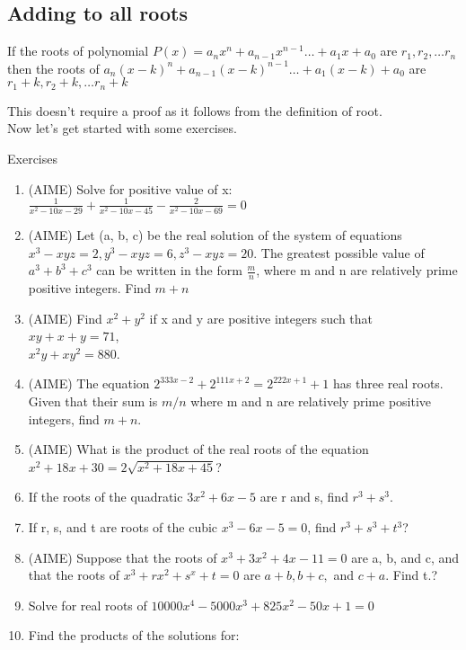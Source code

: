 \subsection{Adding to all roots}
\begin{theorem}
    If the roots of polynomial $P(x)=a_nx^n+a_{n-1}x^{n-1}\dots+a_1x+a_0$ are $r_1,r_2,\dots r_n$ then the roots of $a_n(x-k)^n+a_{n-1}(x-k)^{n-1}\dots+a_{1}(x-k)+a_0$ are $r_1+k, r_2+k, \dots r_n+k$
\end{theorem}
This doesn't require a proof as it follows from the definition of root.\\
Now let's get started with some exercises.
\begin{xcb}{Exercises}
\begin{enumerate}
\item (AIME) Solve for positive value of x:\\
$\frac{1}{x^2-10x-29}+\frac{1}{x^2-10x-45}-\frac{2}{x^2-10x-69}=0$
\item (AIME) Let (a, b, c) be the real solution of the system of equations $x^3 - xyz = 2, y^3 - xyz = 6,
z^3 - xyz = 20$. The greatest possible value of $a^3 + b^3 + c^3$ can be written in the form $\frac{m}{n}$,
where m and n are relatively prime positive integers. Find $m + n$
\item (AIME) Find $x^2 + y^2$ if x and y are positive integers such that\\
$xy + x + y = 71$,\\
$x^2y + xy^2 = 880$.
\item (AIME) The equation $2^{333x-2} + 2^{111x+2} = 2^{222x+1} + 1$ has three real roots. Given that their
sum is $m/n$ where m and n are relatively prime positive integers, find $m + n$.
\item (AIME) What is the product of the real roots of the equation $x^2 + 18x + 30 = 2 \sqrt{x^2 + 18x + 45}$?
\item If the roots of the quadratic $3x^2 + 6x - 5$ are r and s, find $r^3 + s^3$.
\item If r, s, and t are roots of the cubic $x^3 - 6x - 5 = 0$, find $r^3 + s^3 + t^3$?
\item (AIME) Suppose that the roots of $x^3 + 3x^2 + 4x - 11 = 0$ are a, b, and c, and that the roots of $x^3 + rx^2 + s^x + t = 0$ are $a + b, b + c,$ and $c + a$. Find t.?
\item Solve for real roots of $10000x^4 - 5000x^3 + 825x^2 - 50x + 1 = 0$
\item Find the products of the solutions for:\\

\end{enumerate}
\end{xcb}
